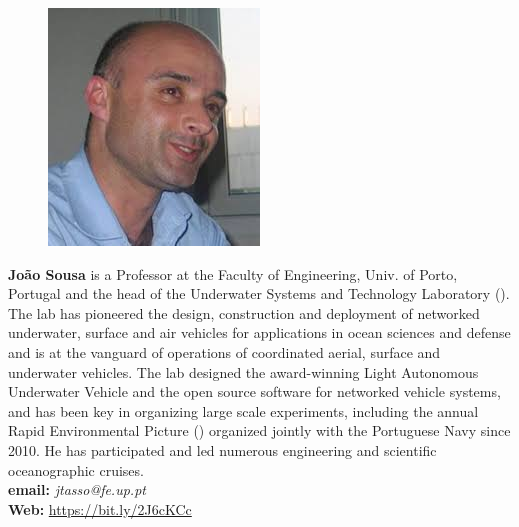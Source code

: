 \documentclass[12pt]{article}
\begin{document}
\vspace*{0.5cm}
\parbox{6.5in}{
\begin{figure}
  \centering
  \includegraphics[width=.75\linewidth]{fig/JBS.jpg}
\end{figure}
\textbf{Jo\~ao Sousa} is a Professor at the Faculty of Engineering,
Univ. of Porto, Portugal and the head of the Underwater Systems and
Technology Laboratory (\lse). The lab has pioneered the design,
construction and deployment of networked underwater, surface and air
vehicles for applications in ocean sciences and defense and is at the
vanguard of operations of coordinated aerial, surface and underwater
vehicles. The lab designed the award-winning Light Autonomous
Underwater Vehicle and the \ls open source software for networked
vehicle systems, and has been key in organizing large scale
experiments, including the annual Rapid Environmental Picture (\rpe)
organized jointly with the Portuguese Navy since 2010. He has
participated and led numerous engineering and scientific oceanographic
cruises.
\\
\textbf{email: }\emph{jtasso@fe.up.pt}\\
\textbf{Web: }\url{https://bit.ly/2J6cKCc}}
\end{document}
